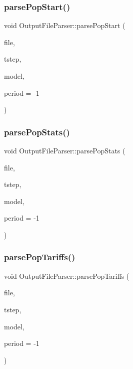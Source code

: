 \subsubsection{\texorpdfstring{parsePopStart()}{parsePopStart()}}
{\footnotesize\ttfamily void Output\+File\+Parser\+::parse\+Pop\+Start (\begin{DoxyParamCaption}\item[{Q\+File $\ast$}]{file,  }\item[{int}]{tstep,  }\item[{\mbox{\hyperlink{class_displace_model}{Displace\+Model}} $\ast$}]{model,  }\item[{int}]{period = {\ttfamily -\/1} }\end{DoxyParamCaption})\hspace{0.3cm}{\ttfamily [protected]}}

\mbox{\label{class_output_file_parser_acf5d73a5c6368aa20d131ecc4e347191}} 
\subsubsection{\texorpdfstring{parsePopStats()}{parsePopStats()}}
{\footnotesize\ttfamily void Output\+File\+Parser\+::parse\+Pop\+Stats (\begin{DoxyParamCaption}\item[{Q\+File $\ast$}]{file,  }\item[{int}]{tstep,  }\item[{\mbox{\hyperlink{class_displace_model}{Displace\+Model}} $\ast$}]{model,  }\item[{int}]{period = {\ttfamily -\/1} }\end{DoxyParamCaption})\hspace{0.3cm}{\ttfamily [protected]}}

\mbox{\label{class_output_file_parser_a53430b2faed0d1421652de52b07ead9c}} 
\subsubsection{\texorpdfstring{parsePopTariffs()}{parsePopTariffs()}}
{\footnotesize\ttfamily void Output\+File\+Parser\+::parse\+Pop\+Tariffs (\begin{DoxyParamCaption}\item[{Q\+File $\ast$}]{file,  }\item[{int}]{tstep,  }\item[{\mbox{\hyperlink{class_displace_model}{Displace\+Model}} $\ast$}]{model,  }\item[{int}]{period = {\ttfamily -\/1} }\end{DoxyParamCaption})\hspace{0.3cm}{\ttfamily [protected]}}

